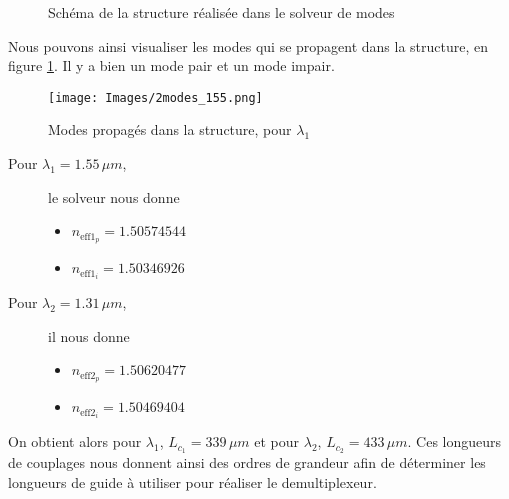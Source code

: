 \documentclass[a4paper,11pt]{report}
\begin{document}
\begin{figure}[H]
\centering
{} 
\caption{Schéma de la structure réalisée dans le solveur de modes}

\end{figure}

Nous pouvons ainsi visualiser les modes qui se propagent dans la structure, en figure \ref{mode}. Il y a bien un mode pair et un mode impair.

\begin{figure}[H]
    \centering
    \texttt{[image: Images/2modes\_155.png]}
    \caption{Modes propagés dans la structure, pour $\lambda_1$}
    \label{mode}
\end{figure}




\begin{description}
    \item[Pour $\lambda_1=1.55\,\mu m$,] le solveur nous donne
    \begin{itemize}
        \item $n_{\text{eff}1_p}=1.50574544$
        \item $n_{\text{eff}1_i}=1.50346926$
    \end{itemize}
    \item[Pour $\lambda_2=1.31\,\mu m$,] il nous donne
    \begin{itemize}
        \item $n_{\text{eff}2_p}=1.50620477$
        \item $n_{\text{eff}2_i}=1.50469404$
    \end{itemize}
\end{description}

On obtient alors pour $\lambda_1$, $L_{c_1}=339\,\mu m$ et pour $\lambda_2$, $L_{c_2}=433\,\mu m$. Ces longueurs de couplages nous donnent ainsi des ordres de grandeur afin de déterminer les longueurs de guide à utiliser pour réaliser le demultiplexeur.
\end{document}
